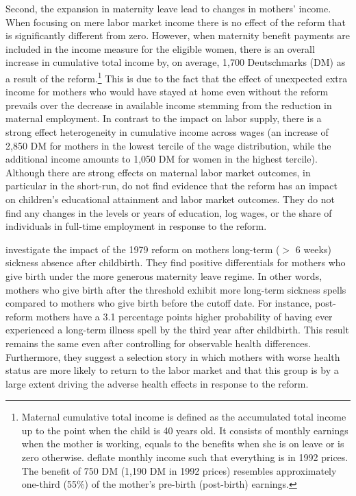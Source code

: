 \documentclass[11pt, a4paper]{article} %
\begin{document}
Second, the expansion in maternity leave lead to changes in mothers' income. When focusing on mere labor market income there is no effect of the reform that is significantly different from zero. However, when maternity benefit payments are included in the income measure for the eligible women, there is an overall increase in cumulative total income by, on average, 1,700 Deutschmarks (DM) as a result of the reform.\footnote{Maternal cumulative total  income is defined as the accumulated total income up to the point when the child is 40 years old. It consists of monthly earnings when the mother is working, equals to the benefits when she is on leave or is zero otherwise.\newline \cite{Dustmann2012} deflate monthly income such that everything is in 1992 prices. The benefit of 750 DM (1,190 DM in 1992 prices) resembles approximately one-third (55\%) of the mother's pre-birth (post-birth) earnings.} This is due to the fact that the effect of unexpected extra income for mothers who would have stayed at home even without the reform prevails over the decrease in available income stemming from the reduction in maternal employment. In contrast to the impact on labor supply, there is a strong effect heterogeneity in cumulative income across wages (an increase of 2,850 DM for mothers in the lowest tercile of the wage distribution, while the additional income amounts to 1,050 DM for women in the highest tercile). \newline
Although there are strong effects on maternal labor market outcomes, in particular in the short-run, \cite{Dustmann2012} do not find evidence that the reform has an impact on children's educational attainment and labor market outcomes. They do not find any changes in the levels or years of education, log wages, or the share of individuals in full-time employment in response to the reform. 


\cite{guertzgen2018} investigate the impact of the 1979 reform on mothers long-term ($>$ 6 weeks) sickness absence after childbirth. They find positive differentials for mothers who give birth under the more generous maternity leave regime. In other words, mothers who give birth after the threshold exhibit more long-term sickness spells compared to mothers who give birth before the cutoff date. For instance, post-reform mothers have a 3.1 percentage points higher probability of having ever experienced a long-term illness spell by the third year after childbirth. This result remains the same even after controlling for observable health differences. Furthermore, they suggest a selection story in which mothers with worse health status are more likely to return to the labor market and that this group is by a large extent driving the adverse health effects in response to the reform.\newline
\end{document}
